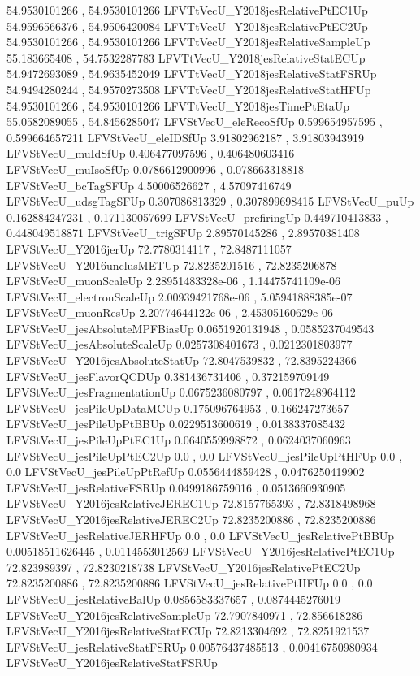 54.9530101266 , 54.9530101266
LFVTtVecU_Y2018jesRelativePtEC1Up
54.9596566376 , 54.9506420084
LFVTtVecU_Y2018jesRelativePtEC2Up
54.9530101266 , 54.9530101266
LFVTtVecU_Y2018jesRelativeSampleUp
55.183665408 , 54.7532287783
LFVTtVecU_Y2018jesRelativeStatECUp
54.9472693089 , 54.9635452049
LFVTtVecU_Y2018jesRelativeStatFSRUp
54.9494280244 , 54.9570273508
LFVTtVecU_Y2018jesRelativeStatHFUp
54.9530101266 , 54.9530101266
LFVTtVecU_Y2018jesTimePtEtaUp
55.0582089055 , 54.8456285047
LFVStVecU_eleRecoSfUp
0.599654957595 , 0.599664657211
LFVStVecU_eleIDSfUp
3.91802962187 , 3.91803943919
LFVStVecU_muIdSfUp
0.406477097596 , 0.406480603416
LFVStVecU_muIsoSfUp
0.0786612900996 , 0.078663318818
LFVStVecU_bcTagSFUp
4.50006526627 , 4.57097416749
LFVStVecU_udsgTagSFUp
0.307086813329 , 0.307899698415
LFVStVecU_puUp
0.162884247231 , 0.171130057699
LFVStVecU_prefiringUp
0.449710413833 , 0.448049518871
LFVStVecU_trigSFUp
2.89570145286 , 2.89570381408
LFVStVecU_Y2016jerUp
72.7780314117 , 72.8487111057
LFVStVecU_Y2016unclusMETUp
72.8235201516 , 72.8235206878
LFVStVecU_muonScaleUp
2.28951483328e-06 , 1.14475741109e-06
LFVStVecU_electronScaleUp
2.00939421768e-06 , 5.05941888385e-07
LFVStVecU_muonResUp
2.20774644122e-06 , 2.45305160629e-06
LFVStVecU_jesAbsoluteMPFBiasUp
0.0651920131948 , 0.0585237049543
LFVStVecU_jesAbsoluteScaleUp
0.0257308401673 , 0.0212301803977
LFVStVecU_Y2016jesAbsoluteStatUp
72.8047539832 , 72.8395224366
LFVStVecU_jesFlavorQCDUp
0.381436731406 , 0.372159709149
LFVStVecU_jesFragmentationUp
0.0675236080797 , 0.0617248964112
LFVStVecU_jesPileUpDataMCUp
0.175096764953 , 0.166247273657
LFVStVecU_jesPileUpPtBBUp
0.0229513600619 , 0.0138337085432
LFVStVecU_jesPileUpPtEC1Up
0.0640559998872 , 0.0624037060963
LFVStVecU_jesPileUpPtEC2Up
0.0 , 0.0
LFVStVecU_jesPileUpPtHFUp
0.0 , 0.0
LFVStVecU_jesPileUpPtRefUp
0.0556444859428 , 0.0476250419902
LFVStVecU_jesRelativeFSRUp
0.0499186759016 , 0.0513660930905
LFVStVecU_Y2016jesRelativeJEREC1Up
72.8157765393 , 72.8318498968
LFVStVecU_Y2016jesRelativeJEREC2Up
72.8235200886 , 72.8235200886
LFVStVecU_jesRelativeJERHFUp
0.0 , 0.0
LFVStVecU_jesRelativePtBBUp
0.00518511626445 , 0.0114553012569
LFVStVecU_Y2016jesRelativePtEC1Up
72.823989397 , 72.8230218738
LFVStVecU_Y2016jesRelativePtEC2Up
72.8235200886 , 72.8235200886
LFVStVecU_jesRelativePtHFUp
0.0 , 0.0
LFVStVecU_jesRelativeBalUp
0.0856583337657 , 0.0874445276019
LFVStVecU_Y2016jesRelativeSampleUp
72.7907840971 , 72.856618286
LFVStVecU_Y2016jesRelativeStatECUp
72.8213304692 , 72.8251921537
LFVStVecU_jesRelativeStatFSRUp
0.00576437485513 , 0.00416750980934
LFVStVecU_Y2016jesRelativeStatFSRUp

